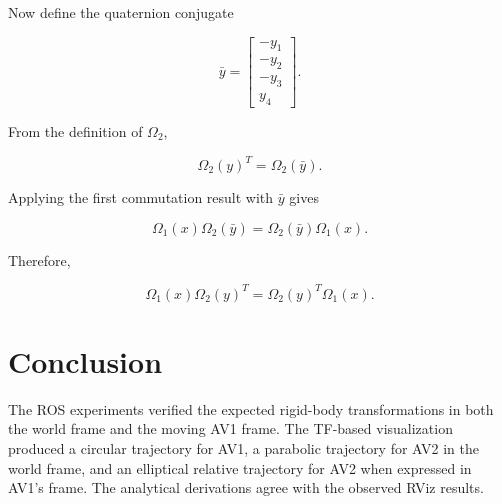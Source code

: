 \documentclass[11pt,a4paper]{article}
\begin{document}
Now define the quaternion conjugate

\[
\bar{y}
=
\begin{bmatrix}
-y_1\\
-y_2\\
-y_3\\
y_4
\end{bmatrix}.
\]

From the definition of $\Omega_2$,

\[
\Omega_2(y)^T
=
\Omega_2(\bar{y}).
\]

Applying the first commutation result with $\bar{y}$ gives

\[
\Omega_1(x)\Omega_2(\bar{y})
=
\Omega_2(\bar{y})\Omega_1(x).
\]

Therefore,

\[
\boxed{
\Omega_1(x)\Omega_2(y)^T
=
\Omega_2(y)^T\Omega_1(x)
}.
\]

\section{Conclusion}

The ROS experiments verified the expected rigid-body transformations in
both the world frame and the moving AV1 frame. The TF-based
visualization produced a circular trajectory for AV1, a parabolic
trajectory for AV2 in the world frame, and an elliptical relative
trajectory for AV2 when expressed in AV1's frame. The analytical
derivations agree with the observed RViz results.
\end{document}
